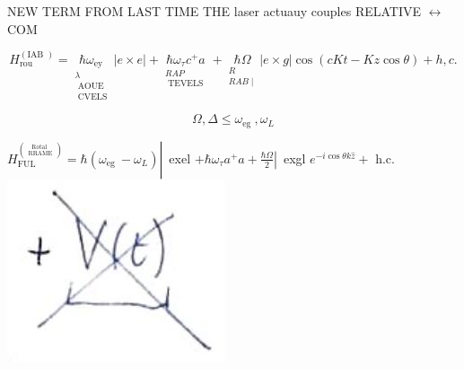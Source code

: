\documentclass[10pt]{article}
\begin{document}
NEW TERM FROM LAST TIME THE laser actuauy couples RELATIVE $\longleftrightarrow$ COM

$$
H_{\text {rou }}^{(\text {IAB })}=\underset{\substack{\lambda \\ \text { AOUE } \\ \text { CVELS }}}{\hbar \omega_{\text {ey }}}|e \times e|+\underset{\substack{R A P \\ \text { TEVELS }}}{\hbar \omega_{\tau} c^{+} a}+\underset{\substack{R \\ R A B \mid}}{\hbar \Omega}|e \times g| \cos (c K t-K z \cos \theta)+h, c .
$$

$$
\Omega, \Delta \leqslant \omega_{\text {eg }}, \omega_{L}
$$

$\left.H_{\text {FUL }}^{\binom{\text {Rotal }}{\text { RRAME }}}=\hbar\left(\omega_{\text {eg }}-\omega_{L}\right) \right\rvert\,$ exel $\left.+\hbar \omega_{\tau} a^{+} a+\frac{\hbar \Omega}{2} \right\rvert\,$ exgl $e^{-i \cos \theta k \hat{z}}+$ h.c.\\
\includegraphics[max width=\textwidth, center]{2025_10_16_9146de9f5ba4f09535e7g-4(2)}
\end{document}

